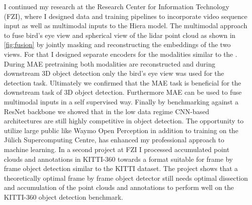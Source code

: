 \begin{minipage}[t]{504pt}
\begin{minipage}[t]{350pt}
I continued my research at the Research Center for Information Technology (FZI), where I designed data and training pipelines 
to incorporate video sequence input as well as multimodal inputs to the Hiera model. The multimodal approach to fuse bird's eye view and 
spherical view of the lidar point cloud as shown in \autoref{fig:fusion} by jointly masking 
and reconstructing the embeddings of the two views. For that I designed separate encoders for the modalities 
similar to the \cite{multimae}. During MAE pretraining both modalities are reconstructed and during downstream 3D object detection
only the bird's eye view was used for the detection task. Ultimately we confirmed that the MAE task is beneficial 
for the downstream task of 3D object detection. Furthermore MAE can be used to fuse multimodal inputs in a self supervised way.
Finally by benchmarking against a ResNet backbone we showed that in the low data regime CNN-based architectures 
are still highly competitive in object detection.
The opportunity to utilize large public like Waymo Open Perception in addition 
 to training on the Jülich Supercomputing Centre, has enhanced my professional approach to machine learning. 
In a second project at FZI I processed accumulated point clouds and annotations in KITTI-360 
 towards a format suitable for frame by frame object detection similar to the KITTI dataset. The project shows
 that a theoretically optimal frame by frame object detector still needs optimal dissection and 
 accumulation of the point clouds and annotations to perform well on the KITTI-360 object detection benchmark.

 
\vspace*{-6pt}


\end{minipage}
\end{minipage}
